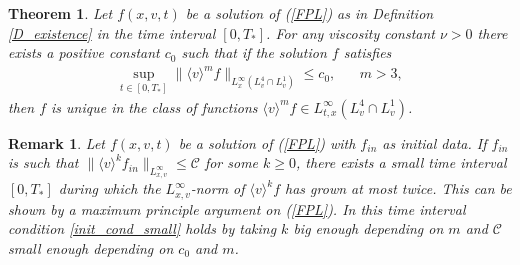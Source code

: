 \documentclass[11pt,american, reqno]{amsart}
\numberwithin{equation}{section}
\newtheorem{theorem}{Theorem}[section]
\newtheorem{remark}{Remark}
\newcommand{\1}{\mathds{1}}
\numberwithin{equation}{section}
\begin{document}
\begin{theorem} \label{Thm_Landau}
Let $f(x,v,t)$ be a solution of (\ref{FPL}) as in Definition \ref{D_existence} in the time interval $[0,T_\ast]$. For any viscosity constant $\nu >0$ there exists a positive constant $c_0$ such that if the solution $f$ satisfies 
\begin{align}\label{init_cond_small}
\sup_{t\in[0,T_\ast]} \| \langle v \rangle ^m f\|_{ L^\infty_{x}(L^4_v \cap L^1_v)} \le c_0, \quad \textrm{  $m > 3$},
\end{align}
then  $f$ is unique in the class of functions $ \langle v \rangle ^m f \in  L^\infty_{t,x}(L^4_v \cap L^1_v)$. 
\end{theorem}

\begin{remark} 
Let $f(x,v,t)$ be a solution of (\ref{FPL}) with $f_{in}$ as initial data. If $f_{in}$ is such that 
 $
\| \langle v \rangle ^k f_{in}\|_{ L^\infty_{x,v}} \le \mathcal{C}
$
for some $k\ge 0$, there exists a small time interval $[0,T_*]$ during which the $ L^\infty_{x,v}$-norm of $\langle v \rangle ^k f$ has grown at most twice. This can be shown by a maximum principle argument on (\ref{FPL}). In this time interval condition \eqref{init_cond_small} holds by taking $k$ big enough depending on $m$ and $\mathcal{C}$ small enough depending on $c_0$ and $m$.






\end{remark}
\end{document}
